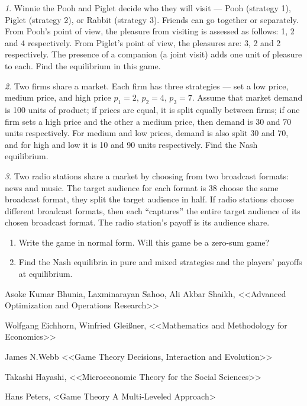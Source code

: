 \documentclass[12pt]{article}
\theoremstyle{remark}
\newtheorem{exercise}{}[subsection]
\begin{document}
\begin{exercise}
Winnie the Pooh and Piglet decide who they will visit --- Pooh
(strategy 1), Piglet (strategy 2), or Rabbit (strategy 3).
Friends can go together or separately. From Pooh's point
of view, the pleasure from visiting is assessed as follows: 1, 2
and 4 respectively. From Piglet's point of view, the pleasures are: 3,
2 and 2 respectively. The presence of a companion (a joint visit)
adds one unit of pleasure to each. Find
the equilibrium in this game.
\end{exercise}

\begin{exercise}
Two firms share a market. Each firm has three strategies --- set a
low price, medium price, and high price $p_1=2$, $p_2=4$,
$p_3=7$. Assume that market demand is 100 units
of product; if prices are equal, it is split equally between firms;
if one firm sets a high price and the other a medium price, then demand
is 30 and 70 units respectively. For medium and low
prices, demand is also split 30 and 70, and for high and low
it is 10 and 90 units respectively. Find the
Nash equilibrium.
\end{exercise}

\begin{exercise}
Two radio stations share a market by choosing from two broadcast formats: news and music.
The target audience for each format is 38%
choose the same broadcast format, they split the target audience in half.
If radio stations choose different broadcast formats, then each ``captures''
the entire target audience of its chosen broadcast format. The radio station's payoff is its audience share.
\begin{enumerate}
	\item Write the game in normal form.
	Will this game be a zero-sum game? %
	\item Find the Nash equilibria in pure and mixed strategies
	and the players' payoffs at equilibrium.
\end{enumerate}
\end{exercise}

\begin{thebibliography}{99}

 Asoke Kumar Bhunia, Laxminarayan Sahoo, Ali Akbar Shaikh,
<<Advanced Optimization and Operations Research>>

 Wolfgang Eichhorn, Winfried Gleißner,
<<Mathematics and Methodology for Economics>>

 James N.Webb <<Game Theory Decisions, Interaction and Evolution>>

 Takashi Hayashi, <<Microeconomic Theory for the Social Sciences>>

 Hans Peters, <Game Theory A Multi-Leveled Approach>

\end{thebibliography}


\end{document}
